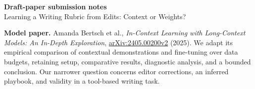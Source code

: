 \documentclass[10pt,letterpaper]{article}
\newcommand{\claim}[2]{#2}
\begin{document}
\begin{center}
{\Large\bfseries Draft-paper submission notes}\\[3pt]
Learning a Writing Rubric from Edits: Context or Weights?
\end{center}

\textbf{Model paper.}
\claim{N01}{Amanda Bertsch et al., \emph{In-Context Learning with Long-Context Models: An In-Depth Exploration},
\href{https://arxiv.org/html/2405.00200v2}{arXiv:2405.00200v2} (2025).
We adapt its empirical comparison of contextual demonstrations and fine-tuning
over data budgets, retaining setup, comparative results, diagnostic analysis,
and a bounded conclusion. Our narrower question concerns editor corrections,
an inferred playbook, and validity in a tool-based writing task.}
\end{document}
